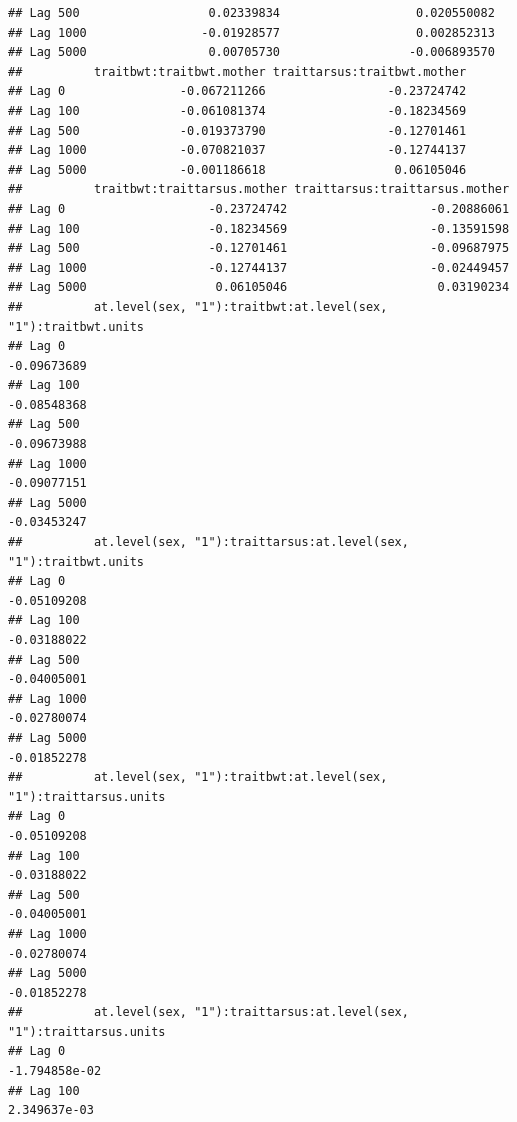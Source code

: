 \documentclass[
  12pt,
]{book}
\begin{document}
\begin{verbatim}
## Lag 500                  0.02339834                   0.020550082
## Lag 1000                -0.01928577                   0.002852313
## Lag 5000                 0.00705730                  -0.006893570
##          traitbwt:traitbwt.mother traittarsus:traitbwt.mother
## Lag 0                -0.067211266                 -0.23724742
## Lag 100              -0.061081374                 -0.18234569
## Lag 500              -0.019373790                 -0.12701461
## Lag 1000             -0.070821037                 -0.12744137
## Lag 5000             -0.001186618                  0.06105046
##          traitbwt:traittarsus.mother traittarsus:traittarsus.mother
## Lag 0                    -0.23724742                    -0.20886061
## Lag 100                  -0.18234569                    -0.13591598
## Lag 500                  -0.12701461                    -0.09687975
## Lag 1000                 -0.12744137                    -0.02449457
## Lag 5000                  0.06105046                     0.03190234
##          at.level(sex, "1"):traitbwt:at.level(sex, "1"):traitbwt.units
## Lag 0                                                      -0.09673689
## Lag 100                                                    -0.08548368
## Lag 500                                                    -0.09673988
## Lag 1000                                                   -0.09077151
## Lag 5000                                                   -0.03453247
##          at.level(sex, "1"):traittarsus:at.level(sex, "1"):traitbwt.units
## Lag 0                                                         -0.05109208
## Lag 100                                                       -0.03188022
## Lag 500                                                       -0.04005001
## Lag 1000                                                      -0.02780074
## Lag 5000                                                      -0.01852278
##          at.level(sex, "1"):traitbwt:at.level(sex, "1"):traittarsus.units
## Lag 0                                                         -0.05109208
## Lag 100                                                       -0.03188022
## Lag 500                                                       -0.04005001
## Lag 1000                                                      -0.02780074
## Lag 5000                                                      -0.01852278
##          at.level(sex, "1"):traittarsus:at.level(sex, "1"):traittarsus.units
## Lag 0                                                          -1.794858e-02
## Lag 100                                                         2.349637e-03

\end{verbatim}
\end{document}

